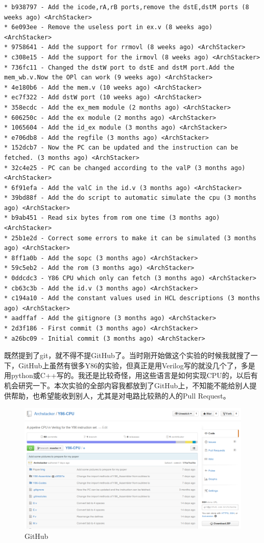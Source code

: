 \begin{verbatim}
* b938797 - Add the icode,rA,rB ports,remove the dstE,dstM ports (8 weeks ago) <ArchStacker>
* 6e093ee - Remove the useless port in ex.v (8 weeks ago) <ArchStacker>
* 9758641 - Add the support for rrmovl (8 weeks ago) <ArchStacker>
* c308e15 - Add the support for the irmovl (8 weeks ago) <ArchStacker>
* 736fc11 - Changed the dstW port to dstE and dstM port.Add the mem_wb.v.Now the OPl can work (9 weeks ago) <ArchStacker>
* 4e180b6 - Add the mem.v (10 weeks ago) <ArchStacker>
* ec7f322 - Add dstW port (10 weeks ago) <ArchStacker>
* 358ecdc - Add the ex_mem module (2 months ago) <ArchStacker>
* 606250c - Add the ex module (2 months ago) <ArchStacker>
* 1065604 - Add the id_ex module (3 months ago) <ArchStacker>
* e706db8 - Add the regfile (3 months ago) <ArchStacker>
* 152dcb7 - Now the PC can be updated and the instruction can be fetched. (3 months ago) <ArchStacker>
* 32c4e25 - PC can be changed according to the valP (3 months ago) <ArchStacker>
* 6f91efa - Add the valC in the id.v (3 months ago) <ArchStacker>
* 39bd88f - Add the do script to automatic simulate the cpu (3 months ago) <ArchStacker>
* b9ab451 - Read six bytes from rom one time (3 months ago) <ArchStacker>
* 25b1e2d - Correct some errors to make it can be simulated (3 months ago) <ArchStacker>
* 8ff1a0b - Add the sopc (3 months ago) <ArchStacker>
* 59c5eb2 - Add the rom (3 months ago) <ArchStacker>
* 0ddcdc3 - Y86 CPU which only can fetch (3 months ago) <ArchStacker>
* cb63c3b - Add the id.v (3 months ago) <ArchStacker>
* c194a10 - Add the constant values used in HCL descriptions (3 months ago) <ArchStacker>
* aadffaf - Add the gitignore (3 months ago) <ArchStacker>
* 2d3f186 - First commit (3 months ago) <ArchStacker>
* a26bc09 - Initial commit (3 months ago) <ArchStacker>
\end{verbatim}

既然提到了git，就不得不提GitHub了。当时刚开始做这个实验的时候我就搜了一下，GitHub上虽然有很多Y86的实验，但真正是用Verilog写的就没几个了，多是用python或C++写的。我还是比较奇怪，用这些语言是如何实现CPU的，以后有机会研究一下。本次实验的全部内容我都放到了GitHub上，不知能不能给别人提供帮助，也希望能收到别人，尤其是对电路比较熟的人的Pull
Request。

\begin{figure}[htbp]
\centering
\includegraphics{img/GitHub.png}
\caption{GitHub}
\end{figure}

